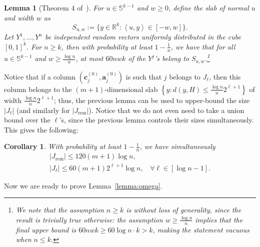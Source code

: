 \documentclass{article}
\newcommand{\red}[1]{{\color{red} #1}}
\newcommand{\R}{\mathbb{R}}
\newcommand{\norm}[1]{\left\lVert#1\right\rVert}
\newcommand{\av}[0]{\mathbf{a}}
\newcommand{\cv}[0]{\mathbf{c}}
\newcommand{\normm}[1]{\big\lVert#1\big\rVert}
\newtheorem{lemma}{Lemma}[section]
\newtheorem{cor}[thm]{Corollary}
\newcommand{\iprod}[2]{\left\langle {#1}, {#2} \right\rangle}
\begin{document}
\begin{lemma}[Theorem 4 of~\cite{dey2021branch}] \label{lemma:uniformSlab}
    For $u \in \mathbb{S}^{k-1}$ and $w \ge 0$, define the \emph{slab} of normal $u$ and width $w$ as $$S_{u,w} := \Big\{y \in \R^k : \iprod{u}{y} \in [-w,w] \Big\}.$$ Let $Y^1,\ldots,Y^n$ be independent random vectors uniformly distributed in the cube $[0,1]^k$. For $n \ge k$, then with probability at least $1 - \frac{1}{n}$, we have that for all $u \in \mathbb{S}^{k-1}$ and $w \ge \frac{\log n}{n}$, at most $60 nwk$ of the $Y^j$'s belong to $S_{u,w}$.\footnote{We note that the assumption $n \ge k$ is without loss of generality, since the result is trivially true otherwise: the assumption $w \ge \frac{\log n}{n}$ implies that the final upper bound is $60 n w k \ge 60 \log n \cdot k > k$, making the statement vacuous when $n \le k$.}
\end{lemma}
Notice that if a column $\left(\cv^{(0)}_j, \av^{(0)}_j\right)$ is such that $j$ belongs to $J_\ell$, then this column belongs to the $(m+1)$-dimensional slab $\left\{y : d(y,H) \le \tfrac{\log n}{n} 2^{\ell+1}\right\}$ of width $\frac{\log n}{n} 2^{\ell+1}$; thus, the previous lemma can be used to upper-bound the size $|J_\ell|$ (and similarly for $|J_{\mathrm{rem}}|$). Notice that we do not even need to take a union bound over the $\ell$'s, since the previous lemma controls their sizes simultaneously. This gives the following:

\begin{cor} \label{cor:J}
    With probability at least $1 - \frac{1}{n}$, we have simultaneously
    \begin{gather*}
        |J_{\mathrm{rem}}| \le 120 (m + 1) \log n,\\
        |J_\ell| \le 60(m+1) 2^{\ell + 1} \log n,~~~~\forall \ell \in [\log n - 1].
    \end{gather*}
\end{cor}

Now we are ready to prove Lemma~\ref{lemma:omega}.

\end{document}
